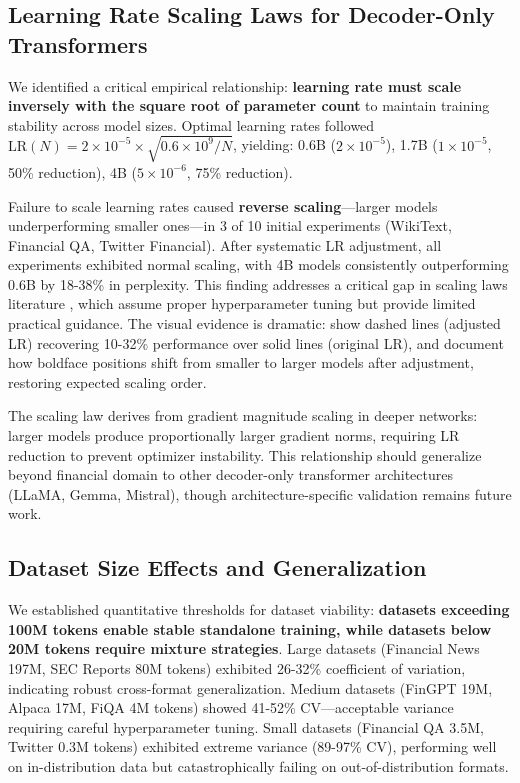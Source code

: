 \subsection{Learning Rate Scaling Laws for Decoder-Only Transformers}

We identified a critical empirical relationship: \textbf{learning rate must scale inversely with the square root of parameter count} to maintain training stability across model sizes. Optimal learning rates followed $\text{LR}(N) = 2 \times 10^{-5} \times \sqrt{0.6 \times 10^9 / N}$, yielding: 0.6B ($2 \times 10^{-5}$), 1.7B ($1 \times 10^{-5}$, 50\% reduction), 4B ($5 \times 10^{-6}$, 75\% reduction).

Failure to scale learning rates caused \textbf{reverse scaling}—larger models underperforming smaller ones—in 3 of 10 initial experiments (WikiText, Financial QA, Twitter Financial). After systematic LR adjustment, all experiments exhibited normal scaling, with 4B models consistently outperforming 0.6B by 18-38\% in perplexity. This finding addresses a critical gap in scaling laws literature \parencite{kaplan2020scaling, hoffmann2022training}, which assume proper hyperparameter tuning but provide limited practical guidance. The visual evidence is dramatic:  show dashed lines (adjusted LR) recovering 10-32\% performance over solid lines (original LR), and  document how boldface positions shift from smaller to larger models after adjustment, restoring expected scaling order.

The scaling law derives from gradient magnitude scaling in deeper networks: larger models produce proportionally larger gradient norms, requiring LR reduction to prevent optimizer instability. This relationship should generalize beyond financial domain to other decoder-only transformer architectures (LLaMA, Gemma, Mistral), though architecture-specific validation remains future work.

\subsection{Dataset Size Effects and Generalization}

We established quantitative thresholds for dataset viability: \textbf{datasets exceeding 100M tokens enable stable standalone training, while datasets below 20M tokens require mixture strategies}. Large datasets (Financial News 197M, SEC Reports 80M tokens) exhibited 26-32\% coefficient of variation, indicating robust cross-format generalization. Medium datasets (FinGPT 19M, Alpaca 17M, FiQA 4M tokens) showed 41-52\% CV—acceptable variance requiring careful hyperparameter tuning. Small datasets (Financial QA 3.5M, Twitter 0.3M tokens) exhibited extreme variance (89-97\% CV), performing well on in-distribution data but catastrophically failing on out-of-distribution formats.

